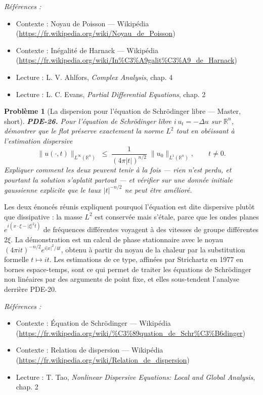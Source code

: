 \documentclass[11pt]{article}
\newtheorem{problem}{Problème}
\newenvironment{refs}{\par\small\noindent\emph{Références :}\begin{itemize}\setlength\itemsep{0pt}}{\end{itemize}\normalsize}
\begin{document}
\begin{refs}
\item Contexte : Noyau de Poisson --- Wikipédia (\url{https://fr.wikipedia.org/wiki/Noyau_de_Poisson})
\item Contexte : Inégalité de Harnack --- Wikipédia (\url{https://fr.wikipedia.org/wiki/In%C3%A9galit%C3%A9_de_Harnack})
\item Lecture : L. V. Ahlfors, \textit{Complex Analysis}, chap. 4
\item Lecture : L. C. Evans, \textit{Partial Differential Equations}, chap. 2
\end{refs}

\bigskip

\begin{problem}[{La dispersion pour l'équation de Schrödinger libre --- Master, short}]
\textbf{PDE-26.} Pour l'équation de Schrödinger libre
$i\,u_t = -\Delta u$ sur $\mathbb{R}^n$, démontrer que le flot préserve exactement la
norme $L^2$ tout en obéissant à l'estimation dispersive
\[ \|u(\cdot,t)\|_{L^\infty(\mathbb{R}^n)} \;\le\; \frac{1}{(4\pi|t|)^{n/2}}\;
\|u_0\|_{L^1(\mathbb{R}^n)}, \qquad t \ne 0. \]
Expliquer comment les deux peuvent tenir à la fois --- rien n'est perdu, et pourtant la solution
s'aplatit partout --- et vérifier sur une donnée initiale gaussienne explicite que le taux
$|t|^{-n/2}$ ne peut être amélioré.
\end{problem}

\noindent Les deux énoncés réunis expliquent pourquoi l'équation est dite
dispersive plutôt que dissipative : la masse $L^2$ est conservée mais s'étale,
parce que les ondes planes $e^{i(x\cdot\xi - |\xi|^2 t)}$ de fréquences différentes voyagent
à des vitesses de groupe différentes $2\xi$. La démonstration est un calcul de phase stationnaire
avec le noyau $(4\pi i t)^{-n/2} e^{i|x|^2/4t}$, obtenu à partir du noyau de la chaleur par la
substitution formelle $t \mapsto it$. Les estimations de ce type, affinées par
Strichartz en 1977 en bornes espace-temps, sont ce qui permet de traiter les équations de
Schrödinger non linéaires par des arguments de point fixe, et elles sous-tendent
l'analyse derrière PDE-20.

\begin{refs}
\item Contexte : Équation de Schrödinger --- Wikipédia (\url{https://fr.wikipedia.org/wiki/%C3%89quation_de_Schr%C3%B6dinger})
\item Contexte : Relation de dispersion --- Wikipédia (\url{https://fr.wikipedia.org/wiki/Relation_de_dispersion})
\item Lecture : T. Tao, \textit{Nonlinear Dispersive Equations: Local and Global Analysis}, chap. 2
\end{refs}
\end{document}
